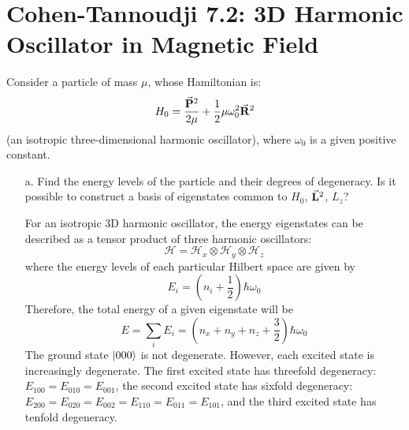 \documentclass[a4paper,twoside]{article}
\begin{document}
\section*{Cohen-Tannoudji 7.2: 3D Harmonic Oscillator in Magnetic Field}
Consider a particle of mass $ \mu $, whose Hamiltonian is:
\begin{equation}
    H_0 = \frac{ \va{P}^2}{2 \mu} + \frac{1}{2} \mu \omega_0^2 \va{R}^2
\end{equation}
(an isotropic three-dimensional harmonic oscillator), where $ \omega_0 $ is a given positive constant.
\begin{itemize}
    \item[a.] Find the energy levels of the particle and their degrees of degeneracy. Is it possible to construct a basis of eigenstates common to $ H_0 $, $ \va{L}^2 $, $ L_z $?
        \begin{problem}
            For an isotropic 3D harmonic oscillator, the energy eigenstates can be described as a tensor product of three harmonic oscillators:
            \begin{equation}
                \mathcal{H} = \mathcal{H}_x \otimes \mathcal{H}_y \otimes \mathcal{H}_z
            \end{equation}
            where the energy levels of each particular Hilbert space are given by
            \begin{equation}
                E_i = \left( n_i + \frac{1}{2} \right) \hbar \omega_0
            \end{equation}
            Therefore, the total energy of a given eigenstate will be
            \begin{equation}
                E = \sum_i E_i = \left( n_x + n_y + n_z + \frac{3}{2} \right) \hbar \omega_0
            \end{equation}
            The ground state $\ket{000} $ is not degenerate. However, each excited state is increasingly degenerate. The first excited state has threefold degeneracy: $ E_{100} = E_{010} = E_{001} $, the second excited state has sixfold degeneracy: $ E_{200} = E_{020} = E_{002} = E_{110} = E_{011} = E_{101} $, and the third excited state has tenfold degeneracy.


\end{problem}
\end{itemize}
\end{document}
